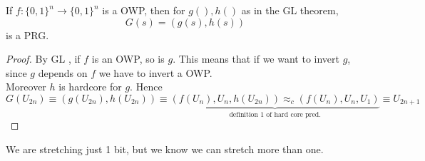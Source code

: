 \begin{cor}
    If $f:\{0,1\}^{n} \to \{0,1\}^{n} $ is a OWP, then for $g(), h()$ as in the
    GL theorem,
    \[
        G(s)=(g(s), h(s))
    \]
    is a PRG.
\end{cor}

\begin{proof}
    By GL , if $f$ is an OWP, so is $g$. This means that if we want to invert
    $g$, since $g$ depends on $f$ we have to invert a OWP.\\
    Moreover $h$ is hardcore for $g$.
    Hence
    \[
        G(U_{2n}) \equiv (g(U_{2n}), h(U_{2n})) \equiv \underbrace{(f(U_{n}), U_{n},
        h(U_{2n})) \approx_{c}(f(U_{n}), U_{n}, U_{1})}_{\text{definition 1 of hard core pred.}}  \equiv U_{2n+1}
    \]

\end{proof}

We are stretching just 1 bit, but we know we can stretch more than one.
\pagebreak
